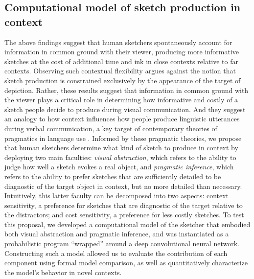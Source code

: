 \documentclass[9pt,twocolumn,twoside]{pnas-new}
\begin{document}




\subsection*{Computational model of sketch production in context}

The above findings suggest that human sketchers spontaneously account for information in common ground with their viewer, producing more informative sketches at the cost of additional time and ink in close contexts relative to far contexts. 
Observing such contextual flexibility argues against the notion that sketch production is constrained exclusively by the appearance of the target of depiction. 
Rather, these results suggest that information in common ground with the viewer plays a critical role in determining how informative and costly of a sketch people decide to produce during visual communication. 
And they suggest an analogy to how context influences how people produce linguistic utterances during verbal communication, a key target of contemporary theories of pragmatics in language use \cite{grice1975syntax,goodman2016pragmatic}.
Informed by these pragmatic theories, we propose that human sketchers determine what kind of sketch to produce in context by deploying two main faculties: \textit{visual abstraction}, which refers to the ability to judge how well a sketch evokes a real object, and \textit{pragmatic inference}, which refers to the ability to prefer sketches that are sufficiently detailed to be diagnostic of the target object in context, but no more detailed than necessary. 
Intuitively, this latter faculty can be decomposed into two aspects: context sensitivity, a preference for sketches that are diagnostic of the target relative to the distractors; and cost sensitivity, a preference for less costly sketches. 
To test this proposal, we developed a computational model of the sketcher that embodied both visual abstraction and pragmatic inference, and was instantiated as a probabilistic program ``wrapped'' around a deep convolutional neural network. 
Constructing such a model allowed us to evaluate the contribution of each component using formal model comparison, as well as quantitatively characterize the model's behavior in novel contexts.
\end{document}
